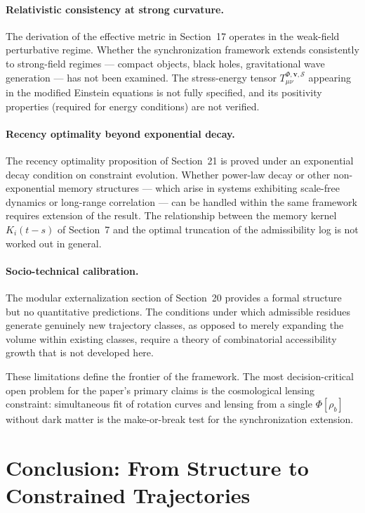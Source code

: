 \documentclass[11pt, a4paper, twocolumn]{article}
\newcommand{\Sfield}{\mathcal{S}}
\begin{document}
\paragraph{Relativistic consistency at strong curvature.}
The derivation of the effective metric in Section~17 operates in the weak-field
perturbative regime. Whether the synchronization framework extends consistently
to strong-field regimes --- compact objects, black holes, gravitational wave
generation --- has not been examined. The stress-energy tensor
$T_{\mu\nu}^{\Phi,\mathbf{v},\Sfield}$ appearing in the modified Einstein
equations is not fully specified, and its positivity properties (required for
energy conditions) are not verified.

\paragraph{Recency optimality beyond exponential decay.}
The recency optimality proposition of Section~21 is proved under an exponential
decay condition on constraint evolution. Whether power-law decay or other
non-exponential memory structures --- which arise in systems exhibiting
scale-free dynamics or long-range correlation --- can be handled within the same
framework requires extension of the result. The relationship between the memory
kernel $K_i(t-s)$ of Section~7 and the optimal truncation of the admissibility
log is not worked out in general.

\paragraph{Socio-technical calibration.}
The modular externalization section of Section~20 provides a formal structure
but no quantitative predictions. The conditions under which admissible residues
generate genuinely new trajectory classes, as opposed to merely expanding the
volume within existing classes, require a theory of combinatorial accessibility
growth that is not developed here.

These limitations define the frontier of the framework. The most
decision-critical open problem for the paper's primary claims is the
cosmological lensing constraint: simultaneous fit of rotation curves and lensing
from a single $\Phi[\rho_b]$ without dark matter is the make-or-break test for
the synchronization extension.

\section{Conclusion: From Structure to Constrained Trajectories}
\end{document}
